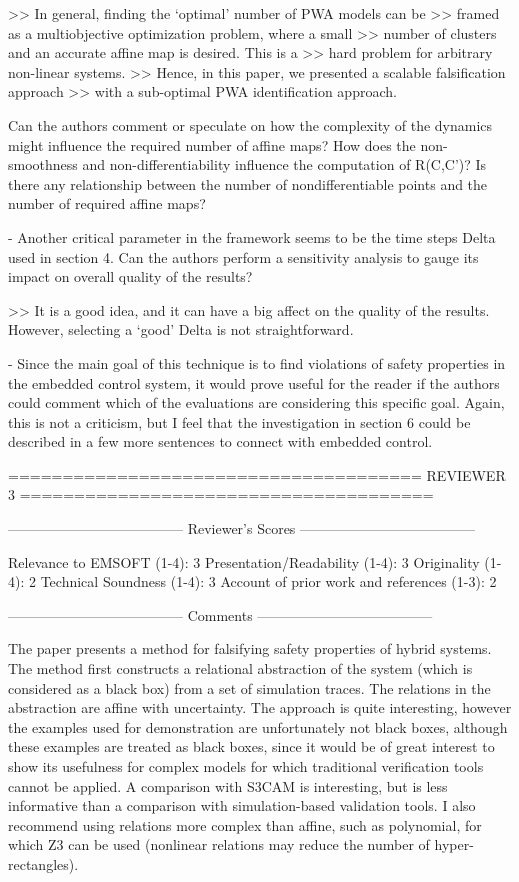>> In general, finding the `optimal' number of PWA models can be
>> framed as a multiobjective optimization problem, where a small
>> number of clusters and an accurate affine map is desired. This is a
>> hard problem for arbitrary non-linear systems.
>> Hence, in this paper, we presented a scalable falsification approach
>> with a sub-optimal PWA identification approach.


Can the authors comment or speculate on how the complexity of the
dynamics might influence the required number of affine maps? How does
the non-smoothness and non-differentiability influence the computation
of R(C,C’)? Is there any relationship between the number of
nondifferentiable points and the number of required affine maps?


- Another critical parameter in the framework seems to be the time steps Delta
used in section 4. Can the authors perform a sensitivity analysis to gauge its
impact on overall quality of the results?

>> It is a good idea, and it can have a big affect on the quality of
the results. However, selecting a `good' Delta is not straightforward.

- Since the main goal of this technique is to find violations of safety
properties in the embedded control system, it would prove useful for the reader
if the authors could comment which of the evaluations are considering this
specific goal. Again, this is not a criticism, but I feel that the
investigation in section 6 could be described in a few more sentences to
connect with embedded control.


======================================
                            REVIEWER 3
======================================


--------------------------------------
Reviewer's Scores
--------------------------------------

               Relevance to EMSOFT (1-4): 3
          Presentation/Readability (1-4): 3
                       Originality (1-4): 2
               Technical Soundness (1-4): 3
Account of prior work and references (1-3): 2


--------------------------------------
Comments
--------------------------------------

The paper presents a method for falsifying safety properties of hybrid systems.
The method first constructs a relational abstraction of the system (which is
considered as a black box) from a set of simulation traces. The relations in
the abstraction are affine with uncertainty. The approach is quite interesting,
however the examples used for demonstration are unfortunately not black boxes,
although these examples are treated as black boxes, since it would be of great
interest to show its usefulness for complex models for which traditional
verification tools cannot be applied. A comparison with S3CAM is interesting,
but is less informative than a comparison with simulation-based validation
tools.
I also recommend using relations more complex than affine, such as polynomial,
for which Z3 can be used (nonlinear relations may reduce the number of
hyper-rectangles).

